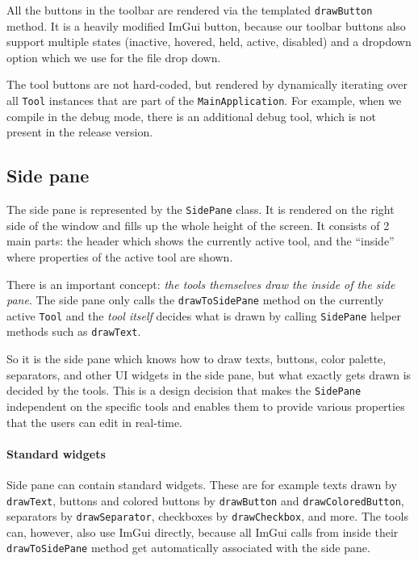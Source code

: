 All the buttons in the toolbar are rendered via the templated \texttt{drawButton} method.
It is a heavily modified ImGui button, because our toolbar buttons also support multiple states (inactive, hovered, held, active, disabled) and a dropdown option which we use for the file drop down.

The tool buttons are not hard-coded, but rendered by dynamically iterating over all \texttt{Tool} instances that are part of the \texttt{MainApplication}.
For example, when we compile in the debug mode, there is an additional debug tool, which is not present in the release version.

\subsection{Side pane}

The side pane is represented by the \texttt{SidePane} class.
It is rendered on the right side of the window and fills up the whole height of the screen.
It consists of 2 main parts: the header which shows the currently active tool, and the ``inside'' where properties of the active tool are shown.

There is an important concept: \emph{the tools themselves draw the inside of the side pane}.
The side pane only calls the \texttt{drawToSidePane} method on the currently active \texttt{Tool} and the \emph{tool itself} decides what is drawn by calling \texttt{SidePane} helper methods such as \texttt{drawText}.

So it is the side pane which knows how to draw texts, buttons, color palette, separators, and other UI widgets in the side pane, but what exactly gets drawn is decided by the tools.
This is a design decision that makes the \texttt{SidePane} independent on the specific tools and enables them to provide various properties that the users can edit in real-time.

\paragraph{Standard widgets}
Side pane can contain standard widgets.
These are for example texts drawn by \texttt{drawText}, buttons and colored buttons by \texttt{drawButton} and \texttt{drawColoredButton}, separators by \texttt{drawSeparator}, checkboxes by \texttt{drawCheckbox}, and more.
The tools can, however, also use ImGui directly, because all ImGui calls from inside their \texttt{drawToSidePane} method get automatically associated with the side pane.

